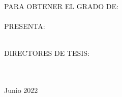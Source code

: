 \begin{titlepage}
\begin{minipage}[c][0.81\textheight][t]{0.75\textwidth}
\begin{center}
                \vspace{2cm}            

                \textsc{\large PARA OBTENER EL GRADO DE:}\\[0.5cm]
                \textsc{\large \degreename}\\[0.5cm]
                \textsc{\large PRESENTA:}\\[0.5cm]
                \textsc{\large {\authorname}}\\[2cm]          

                \vspace{0.5cm}

                {\large\scshape DIRECTORES DE TESIS:\\[0.3cm] {\supname} \\[0.3cm] {\cosupname} }\\[.2in]

                \vspace{0.5cm}

                \large{\addressname \hspace{5cm}Junio 2022}{ }{}
            \end{center}
        \end{minipage}
    \end{titlepage}